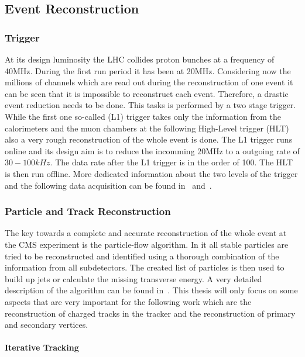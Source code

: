 \subsection{Event Reconstruction \label{LHCCMSEventReco}}

\subsubsection{Trigger}

At its design luminosity the LHC collides proton bunches at a frequency of 40\unit{MHz}. During the first run period it has been at 20\unit{MHz}. Considering now the millions of channels which are read out during the reconstruction of one event it can be seen that it is impossible to reconstruct each event. Therefore, a drastic event reduction needs to be done. This tasks is performed by a two stage trigger. While the first one so-called \Lone{} (L1) trigger takes only the information from the calorimeters and the muon chambers at the following High-Level trigger (HLT) also a very rough reconstruction of the whole event is done. The L1 trigger runs online and its design aim is to reduce the incomming 20\unit{MHz} to a outgoing rate of $30-100\unit{kHz}$. The data rate after the L1 trigger is in the order of 100\GBytes{}. The HLT is then run offline. More dedicated information about the two levels of the trigger and the following data acquisition can be found in~ and~.

\subsubsection{Particle and Track Reconstruction}

The key towards a complete and accurate reconstruction of the whole event at the CMS experiment is the particle-flow algorithm. In it all stable particles are tried to be reconstructed and identified using a thorough combination of the information from all subdetectors. The created list of particles is then used to build up jets or calculate the missing transverse energy. A very detailed description of the algorithm can be found in~. This thesis will only focus on some aspects that are very important for the following work which are the reconstruction of charged tracks in the tracker and the reconstruction of primary and secondary vertices.

\paragraph{Iterative Tracking}

